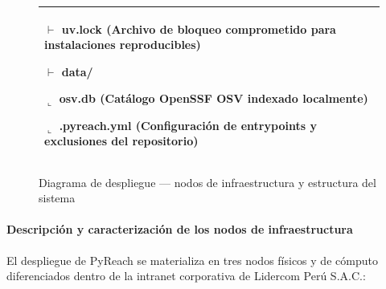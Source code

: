 \begin{figure}[H]
\begin{minipage}{0.92\textwidth}
\begin{tabular}{|p{}|}
        \quad $\vdash$ \textbf{uv.lock} \hfill (Archivo de bloqueo comprometido para instalaciones reproducibles) \par
        \quad $\vdash$ \textbf{data/} \par
        \quad \quad $\llcorner$ \textbf{osv.db} \hfill (Catálogo OpenSSF OSV indexado localmente) \par
        \quad $\llcorner$ \textbf{.pyreach.yml} \hfill (Configuración de entrypoints y exclusiones del repositorio) \\
        \hline
        \end{tabular}
    \end{minipage}
    \caption{Diagrama de despliegue --- nodos de infraestructura y estructura del sistema}
    \label{p5:fig:diagrama_despliegue}
\end{figure}

\paragraph*{Descripción y caracterización de los nodos de infraestructura}
El despliegue de PyReach se materializa en tres nodos físicos y de cómputo diferenciados dentro de la intranet corporativa de Lidercom Perú S.A.C.:

